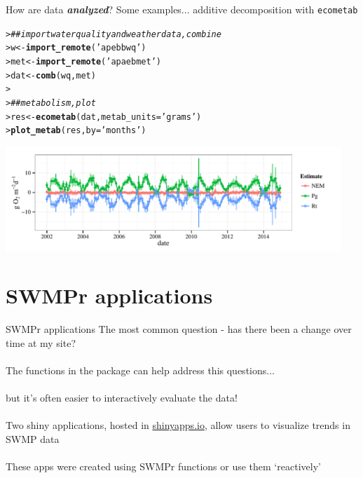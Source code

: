 \documentclass[serif]{beamer}\usepackage[]{graphicx}\usepackage[]{color}
\makeatletter
\newcommand{\hlstr}[1]{\textcolor[rgb]{0.192,0.494,0.8}{#1}}%
\newcommand{\hlcom}[1]{\textcolor[rgb]{0.678,0.584,0.686}{\textit{#1}}}%
\newcommand{\hlstd}[1]{\textcolor[rgb]{0.345,0.345,0.345}{#1}}%
\newcommand{\hlkwb}[1]{\textcolor[rgb]{0.69,0.353,0.396}{#1}}%
\newcommand{\hlkwc}[1]{\textcolor[rgb]{0.333,0.667,0.333}{#1}}%
\newcommand{\hlkwd}[1]{\textcolor[rgb]{0.737,0.353,0.396}{\textbf{#1}}}%
\newenvironment{kframe}{%
 \def\at@end@of@kframe{}%
 \ifinner\ifhmode%
  \def\at@end@of@kframe{\end{minipage}}%
  \begin{minipage}{\columnwidth}%
 \fi\fi%
 \def\FrameCommand##1{\hskip\@totalleftmargin \hskip-\fboxsep
 \colorbox{shadecolor}{##1}\hskip-\fboxsep
     \hskip-\linewidth \hskip-\@totalleftmargin \hskip\columnwidth}%
 \MakeFramed {\advance\hsize-\width
   \@totalleftmargin\z@ \linewidth\hsize
   \@setminipage}}%
 {\par\unskip\endMakeFramed%
 \at@end@of@kframe}
\newenvironment{knitrout}{}{} %
\newcommand{\Bigtxt}[1]{\textbf{\textit{#1}}}
\makeatother
\begin{document}
\begin{frame}[fragile,t]{How are data \Bigtxt{analyzed}?}
Some examples... additive decomposition with \texttt{ecometab}
\begin{knitrout}\scriptsize
{}\color{fgcolor}\begin{kframe}
\begin{alltt}
\hlstd{> }\hlcom{## import water quality and weather data, combine}
\hlstd{> }\hlstd{w} \hlkwb{<-} \hlkwd{import_remote}\hlstd{(}\hlstr{'apebbwq'}\hlstd{)}
\hlstd{> }\hlstd{met} \hlkwb{<-} \hlkwd{import_remote}\hlstd{(}\hlstr{'apaebmet'}\hlstd{)}
\hlstd{> }\hlstd{dat} \hlkwb{<-} \hlkwd{comb}\hlstd{(wq, met)}
\hlstd{> }
\hlstd{> }\hlcom{## metabolism, plot}
\hlstd{> }\hlstd{res} \hlkwb{<-} \hlkwd{ecometab}\hlstd{(dat,} \hlkwc{metab_units} \hlstd{=} \hlstr{'grams'}\hlstd{)}
\hlstd{> }\hlkwd{plot_metab}\hlstd{(res,} \hlkwc{by} \hlstd{=} \hlstr{'months'}\hlstd{)}
\end{alltt}
\end{kframe}
\end{knitrout}
\begin{knitrout}
\color{fgcolor}

{\centering \includegraphics[width=0.95\textwidth]{fig//ecometab} 

}



\end{knitrout}
\end{frame}

\section{SWMPr applications}

\begin{frame}{SWMPr applications}
The most common question - has there been a change over time at my site? \\~\\
The functions in the package can help address this questions...\\~\\
but it's often easier to interactively evaluate the data! \\~\\
Two shiny applications, hosted in \href{http://www.shinyapps.io/}{shinyapps.io}, allow users to visualize trends in SWMP data \\~\\
These apps were created using SWMPr functions or use them `reactively'
\end{frame}
\end{document}
